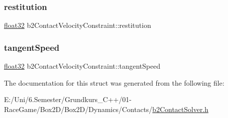 \mbox{\label{structb2_contact_velocity_constraint_a6734f74c1970abc64ed7dcffd8737257}} 
\subsubsection{\texorpdfstring{restitution}{restitution}}
{\footnotesize\ttfamily \mbox{\hyperlink{b2_settings_8h_aacdc525d6f7bddb3ae95d5c311bd06a1}{float32}} b2\+Contact\+Velocity\+Constraint\+::restitution}

\mbox{\label{structb2_contact_velocity_constraint_aaf6acabb0ef62eeac647250e2520a272}} 
\subsubsection{\texorpdfstring{tangentSpeed}{tangentSpeed}}
{\footnotesize\ttfamily \mbox{\hyperlink{b2_settings_8h_aacdc525d6f7bddb3ae95d5c311bd06a1}{float32}} b2\+Contact\+Velocity\+Constraint\+::tangent\+Speed}



The documentation for this struct was generated from the following file\+:\begin{DoxyCompactItemize}
\item 
E\+:/\+Uni/6.\+Semester/\+Grundkurs\+\_\+\+C++/01-\/\+Race\+Game/\+Box2\+D/\+Box2\+D/\+Dynamics/\+Contacts/\mbox{\hyperlink{b2_contact_solver_8h}{b2\+Contact\+Solver.\+h}}\end{DoxyCompactItemize}
